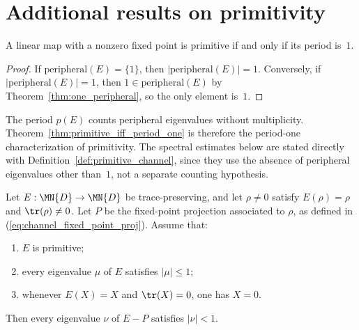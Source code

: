 \section{Additional results on primitivity}

\begin{theorem}\label{thm:primitive_iff_period_one}
    \leanok
    A linear map with a nonzero fixed point is primitive if and only if
    its period is~$1$.
\end{theorem}

\begin{proof}\leanok{}
    If $\mathrm{peripheral}(E)=\{1\}$, then
    $|\mathrm{peripheral}(E)|=1$.
    Conversely, if $|\mathrm{peripheral}(E)|=1$, then
    $1\in\mathrm{peripheral}(E)$ by
    Theorem~\ref{thm:one_peripheral}, so the only element is~$1$.
\end{proof}

\begin{remark}%
    \label{rem:primitive_period_one_characterization}
    \leanok
    The period $p(E)$ counts peripheral eigenvalues without multiplicity.
    Theorem~\ref{thm:primitive_iff_period_one} is therefore the period-one
    characterization of primitivity. The spectral estimates below are stated
    directly with Definition~\ref{def:primitive_channel}, since they use the
    absence of peripheral eigenvalues other than~$1$, not a separate counting
    hypothesis.
\end{remark}

\begin{theorem}%
    \label{thm:primitive_compl_lt_one}
    \leanok
    Let $E:\MN{D}\to\MN{D}$ be trace-preserving, and let
    $\rho\neq0$ satisfy $E(\rho)=\rho$ and $\tr(\rho)\neq0$.
    Let $P$ be the fixed-point projection associated to $\rho$, as defined
    in (\ref{eq:channel_fixed_point_proj}). Assume that:
    \begin{enumerate}
        \item $E$ is primitive;
        \item every eigenvalue $\mu$ of $E$ satisfies $|\mu|\le1$;
        \item whenever $E(X)=X$ and $\tr(X)=0$, one has $X=0$.
    \end{enumerate}
    Then every eigenvalue $\nu$ of $E-P$ satisfies $|\nu|<1$.
\end{theorem}

